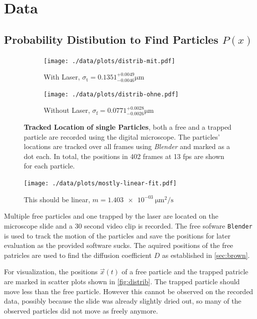 \chapter{Data}

\section{Probability Distibution to Find Particles $P(x)$}

\begin{figure}
  \centering
  \begin{subfigure}{.45\textwidth}
    \centering
    \texttt{[image: ./data/plots/distrib-mit.pdf]}
    \caption{With Laser, $\sigma_\text{t} = \num{0.1351}^{+0.0049}_{-0.0046}\si{\um}$}
  \end{subfigure}
  \begin{subfigure}{.45\textwidth}
    \centering
    \texttt{[image: ./data/plots/distrib-ohne.pdf]}
    \caption{Without Laser, $\sigma_\text{f} = \num{0.0771}^{+0.0028}_{-0.0026}\si{\um}$}
  \end{subfigure}
  \caption[Tracked Location of single Particles]{\textbf{Tracked Location of single Particles}, both a free and a trapped particle are recorded using the digital microscope. The particles' locations are tracked over all frames using \textit{Blender} and marked as a dot each. In total, the positions in 402 frames at 13 fps are shown for each particle.}
	\label{fig:distrib}
\end{figure}

\begin{figure}
  \centering
  \texttt{[image: ./data/plots/mostly-linear-fit.pdf]}
  \caption{This should be linear, $m = \SI{1.403e-03}{\um\squared\per\second}$}
\end{figure}

Multiple free particles and one trapped by the laser are located on the microscope slide and a \num{30} second video clip is recorded.
The free sofware \texttt{Blender} is used to track the motion of the particles and save the positions for later evaluation as the provided software sucks. 
The aquired positions of the free patricles are used to find the diffusion coefficient $D$ as established in \autoref{sec:brown}.

For visualization, the positions $\vec{x}(t)$ of a free particle and the trapped patricle are marked in scatter plots shown in \autoref{fig:distrib}.
The trapped particle should move less than the free particle.
However this cannot be observed on the recorded data, possibly because the slide was already slightly dried out, so many of the observed particles did not move as freely anymore.

